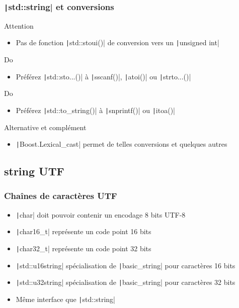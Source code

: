 \documentclass[C++.tex]{subfiles}
\begin{document}
\begin{frame}[fragile]
	\frametitle{\texttt|std::string| et conversions}
	\begin{alertblock}{Attention}
		\begin{itemize}
			\item Pas de fonction \texttt|std::stoui()| de conversion vers un \texttt|unsigned int|
		\end{itemize}
	\end{alertblock}

	\begin{exampleblock}{Do}
		\begin{itemize}
			\item Préférez \texttt|std::sto...()| à \texttt|sscanf()|, \texttt|atoi()| ou \texttt|strto...()|
		\end{itemize}
	\end{exampleblock}

	\begin{exampleblock}{Do}
		\begin{itemize}
			\item Préférez \texttt|std::to_string()| à \texttt|snprintf()| ou \texttt|itoa()|
		\end{itemize}
	\end{exampleblock}

	\begin{block}{Alternative et complément}
		\begin{itemize}
			\item \texttt|Boost.Lexical_cast| permet de telles conversions et quelques autres
		\end{itemize}
	\end{block}
\end{frame}

\subsection*{string UTF}
\begin{frame}[fragile]
	\frametitle{Chaînes de caractères UTF}
	\begin{itemize}
		\item \texttt|char| doit pouvoir contenir un encodage 8 bits UTF-8


		\item \texttt|char16_t| représente un code point 16 bits
		\item \texttt|char32_t| représente un code point 32 bits
		\item \texttt|std::u16string| spécialisation de \texttt|basic_string| pour caractères 16 bits
		\item \texttt|std::u32string| spécialisation de \texttt|basic_string| pour caractères 32 bits
		\item Même interface que \texttt|std::string|
	\end{itemize}
\end{frame}
\end{document}
